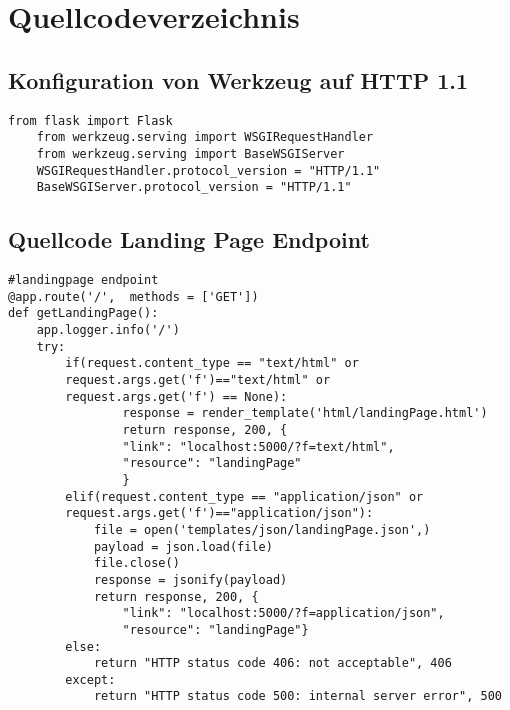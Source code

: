 \newpage
\restoregeometry
\renewcommand{\lstlistingname}{Quellcode}
\section{Quellcodeverzeichnis}

\subsection{Konfiguration von Werkzeug auf HTTP 1.1}
\begin{lstlisting}[caption={Konfiguration von Werkzeug auf HTTP 1.1}, style = Python]
    from flask import Flask
    from werkzeug.serving import WSGIRequestHandler
    from werkzeug.serving import BaseWSGIServer
    WSGIRequestHandler.protocol_version = "HTTP/1.1"
    BaseWSGIServer.protocol_version = "HTTP/1.1"
\end{lstlisting}\label{appendixconfWerkzeug}

\subsection{Quellcode Landing Page Endpoint}
\begin{lstlisting}[caption={Landing Page Endpoint}, style = Python]
#landingpage endpoint
@app.route('/',  methods = ['GET'])
def getLandingPage():
    app.logger.info('/') 
    try:
        if(request.content_type == "text/html" or
        request.args.get('f')=="text/html" or 
        request.args.get('f') == None):
                response = render_template('html/landingPage.html') 
                return response, 200, {
                "link": "localhost:5000/?f=text/html", 
                "resource": "landingPage"
                } 
        elif(request.content_type == "application/json" or
        request.args.get('f')=="application/json"): 
            file = open('templates/json/landingPage.json',) 
            payload = json.load(file) 
            file.close() 
            response = jsonify(payload) 
            return response, 200, {
                "link": "localhost:5000/?f=application/json", 
                "resource": "landingPage"} 
        else:
            return "HTTP status code 406: not acceptable", 406 
        except:
            return "HTTP status code 500: internal server error", 500 
\end{lstlisting}\label{appendixLandingPage}

\newpage
